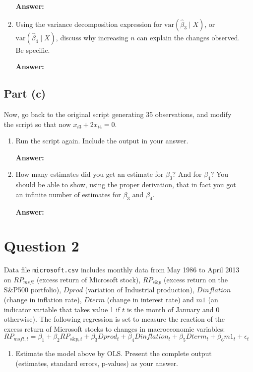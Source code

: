 \documentclass[12pt,a4paper]{article}
\begin{document}
\begin{enumerate}[label=(\roman*)]
\begin{enumerate}[label=(\roman*)]
  \textbf{Answer:} 
  
  \item Using the variance decomposition expression for $\text{var}(\hat{\beta}_3 \mid X)$, or $\text{var}(\hat{\beta}_4 \mid X)$, discuss why increasing $n$ can explain the changes observed. Be specific.
  
  \textbf{Answer:} 
\end{enumerate}

\subsection*{Part (c)}
Now, go back to the original script generating 35 observations, and modify the script so that now $x_{i3} + 2x_{i4} = 0$.

\begin{enumerate}[label=(\roman*)]
  \item Run the script again. Include the output in your answer.
  
  \textbf{Answer:} 
  
  \item How many estimates did you get an estimate for $\beta_3$? And for $\beta_4$? You should be able to show, using the proper derivation, that in fact you got an infinite number of estimates for $\beta_3$ and $\beta_4$.
  
  \textbf{Answer:} 
\end{enumerate}

\newpage

\section*{Question 2}
Data file \texttt{microsoft.csv} includes monthly data from May 1986 to April 2013 on $RP_{msft}$ (excess return of Microsoft stock), $RP_{s\&p}$ (excess return on the S\&P500 portfolio), $Dprod$ (variation of Industrial production), $Dinflation$ (change in inflation rate), $Dterm$ (change in interest rate) and $m1$ (an indicator variable that takes value 1 if $t$ is the month of January and 0 otherwise). The following regression is set to measure the reaction of the excess return of Microsoft stocks to changes in macroeconomic variables:
\[
RP_{msft,t} = \beta_1 + \beta_2 RP_{s\&p,t} + \beta_3 Dprod_t + \beta_4 Dinflation_t + \beta_5 Dterm_t + \beta_6 m1_t + \epsilon_t
\]

\begin{enumerate}[label=(\alph*)]
  \item Estimate the model above by OLS. Present the complete output (estimates, standard errors, p-values) as your answer.
  

\end{enumerate}
\end{enumerate}
\end{document}
